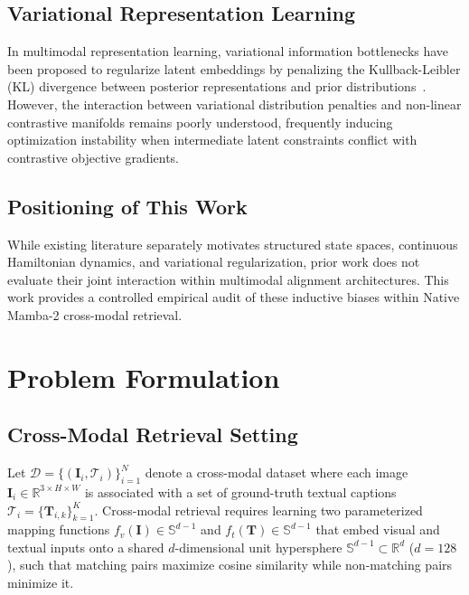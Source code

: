 \documentclass[10pt,journal,final]{IEEEtran}
\begin{document}
\subsection{Variational Representation Learning}
In multimodal representation learning, variational information bottlenecks have been proposed to regularize latent embeddings by penalizing the Kullback-Leibler (KL) divergence between posterior representations and prior distributions~\cite{kingma2014auto,alemi2017deep}. However, the interaction between variational distribution penalties and non-linear contrastive manifolds remains poorly understood, frequently inducing optimization instability when intermediate latent constraints conflict with contrastive objective gradients.

\subsection{Positioning of This Work}
While existing literature separately motivates structured state spaces, continuous Hamiltonian dynamics, and variational regularization, prior work does not evaluate their joint interaction within multimodal alignment architectures. This work provides a controlled empirical audit of these inductive biases within Native Mamba-2 cross-modal retrieval.

\section{Problem Formulation}
\label{sec:formulation}

\subsection{Cross-Modal Retrieval Setting}
Let $\mathcal{D} = \{(\mathbf{I}_i, \mathcal{T}_i)\}_{i=1}^N$ denote a cross-modal dataset where each image $\mathbf{I}_i \in \mathbb{R}^{3 \times H \times W}$ is associated with a set of ground-truth textual captions $\mathcal{T}_i = \{\mathbf{T}_{i, k}\}_{k=1}^{K}$. Cross-modal retrieval requires learning two parameterized mapping functions $f_v(\mathbf{I}) \in \mathbb{S}^{d-1}$ and $f_t(\mathbf{T}) \in \mathbb{S}^{d-1}$ that embed visual and textual inputs onto a shared $d$-dimensional unit hypersphere $\mathbb{S}^{d-1} \subset \mathbb{R}^d$ ($d=128$), such that matching pairs maximize cosine similarity while non-matching pairs minimize it.
\end{document}
